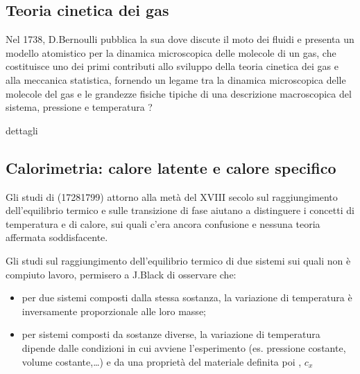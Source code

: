 \documentclass[letterpaper,10pt,italian]{jupyterBook}
\begin{document}
\subsection{Teoria cinetica dei gas}
\label{\detokenize{ch/thermodynamics/foundation-experiments:teoria-cinetica-dei-gas}}\label{\detokenize{ch/thermodynamics/foundation-experiments:physics-hs-thermodynamics-foundation-experiments-kinetic-theory}}
\sphinxAtStartPar
Nel 1738, D.Bernoulli pubblica la sua  dove discute il moto dei fluidi e presenta un modello atomistico per la dinamica microscopica delle molecole di un gas, che costituisce uno dei primi contributi allo sviluppo della teoria cinetica dei gas e alla meccanica statistica, fornendo un legame tra la dinamica microscopica delle molecole del gas e le grandezze fisiche tipiche di una descrizione macroscopica del sistema, pressione e  temperatura  ? 

\sphinxAtStartPar
 dettagli 


\subsection{Calorimetria: calore latente e calore specifico}
\label{\detokenize{ch/thermodynamics/foundation-experiments:calorimetria-calore-latente-e-calore-specifico}}\label{\detokenize{ch/thermodynamics/foundation-experiments:physics-hs-thermodynamics-foundation-experiments-calorimetry}}
\sphinxAtStartPar
Gli studi di  (1728\sphinxhyphen{}1799) attorno alla metà del XVIII secolo sul raggiungimento dell’equilibrio termico e sulle transizione di fase aiutano a distinguere i concetti di temperatura e di calore, sui quali c’era ancora confusione e nessuna teoria affermata soddisfacente.

\sphinxAtStartPar
Gli studi sul raggiungimento dell’equilibrio termico di due sistemi sui quali non è compiuto lavoro, permisero a J.Black di osservare che:
\begin{itemize}
\item {} 
\sphinxAtStartPar
per due sistemi composti dalla stessa sostanza, la variazione di temperatura è inversamente proporzionale alle loro masse;

\item {} 
\sphinxAtStartPar
per sistemi composti da sostanze diverse, la variazione di temperatura dipende dalle condizioni in cui avviene l’esperimento (es. pressione costante, volume costante,…) e da una proprietà del materiale definita poi , \(c_x\)

\end{itemize}
\end{document}
